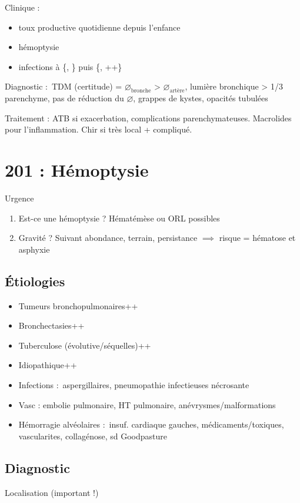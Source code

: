 \documentclass{article}
\begin{document}
Clinique :
\begin{itemize}
\item toux productive quotidienne depuis l'enfance
\item hémoptysie
\item infections à \{, \} puis \{,
  ++\}
\end{itemize}

Diagnostic : TDM (certitude) = $\diameter_\text{bronche}$ > $\diameter_\text{artère}$, lumière
bronchique > 1/3 parenchyme, pas de réduction du $\diameter$, grappes de kystes,
opacités tubulées

Traitement : ATB si exacerbation, complications parenchymateuses. Macrolides
pour l'inflammation. Chir si très local + compliqué.

\section{201 : Hémoptysie}%
\label{sec:201_hemoptysie}

Urgence \skull

\begin{enumerate}
\item Est-ce une hémoptysie ? Hématémèse ou ORL possibles
\item Gravité ? Suivant abondance, terrain, persistance $\implies$ risque = hématose et asphyxie
\end{enumerate}

\subsection{Étiologies}
\begin{itemize}
\item Tumeurs bronchopulmonaires++
\item Bronchectasies++
\item Tuberculose (évolutive/séquelles)++
\item Idiopathique++
\item Infections : aspergillaires, pneumopathie infectieuses nécrosante
\item Vasc : embolie pulmonaire, HT pulmonaire, anévrysmes/malformations
\item Hémorragie alvéolaires : insuf. cardiaque gauches, médicaments/toxiques,
  vascularites, collagénose, sd Goodpasture
\end{itemize}

\subsection{Diagnostic}
Localisation (important !)
\end{document}
